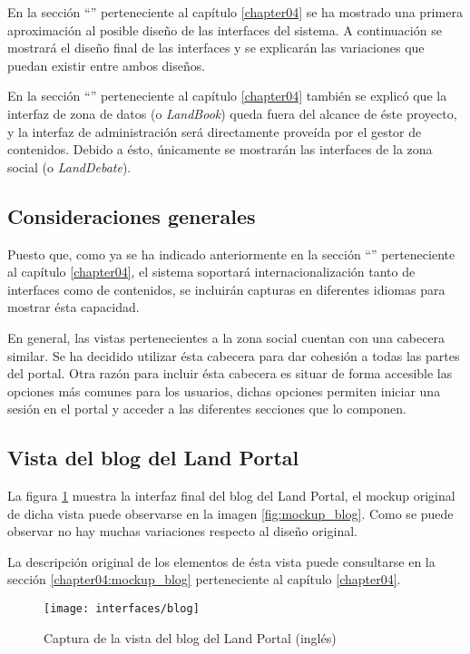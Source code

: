 En la sección ``'' perteneciente al capítulo \ref{chapter04} se ha mostrado una primera aproximación al posible diseño de las interfaces del sistema.  A continuación se mostrará el diseño final de las interfaces y se explicarán las variaciones que puedan existir entre ambos diseños.

En la sección ``'' perteneciente al capítulo \ref{chapter04} también se explicó que la interfaz de zona de datos (o \textit{LandBook}) queda fuera del alcance de éste proyecto, y la interfaz de administración será directamente proveída por el gestor de contenidos.  Debido a ésto, únicamente se mostrarán las interfaces de la zona social (o \textit{LandDebate}).

\subsection{Consideraciones generales}
Puesto que, como ya se ha indicado anteriormente en la sección ``'' perteneciente al capítulo \ref{chapter04}, el sistema soportará internacionalización tanto de interfaces como de contenidos, se incluirán capturas en diferentes idiomas para mostrar ésta capacidad.

En general, las vistas pertenecientes a la zona social cuentan con una cabecera similar.  Se ha decidido utilizar ésta cabecera para dar cohesión a todas las partes del portal.  Otra razón para incluir ésta cabecera es situar de forma accesible las opciones más comunes para los usuarios, dichas opciones permiten iniciar una sesión en el portal y acceder a las diferentes secciones que lo componen.


\subsection{Vista del blog del Land Portal}
La figura \ref{fig:interface_blog} muestra la interfaz final del blog del Land Portal, el mockup original de dicha vista puede observarse en la imagen \ref{fig:mockup_blog}.  Como se puede observar no hay muchas variaciones respecto al diseño original.  

La descripción original de los elementos de ésta vista puede consultarse en la sección \ref{chapter04:mockup_blog} perteneciente al capítulo \ref{chapter04}.

\begin{figure}[h]
	\centering
	\texttt{[image: interfaces/blog]}
	\caption{Captura de la vista del blog del Land Portal (inglés)}
	\label{fig:interface_blog}
\end{figure}

